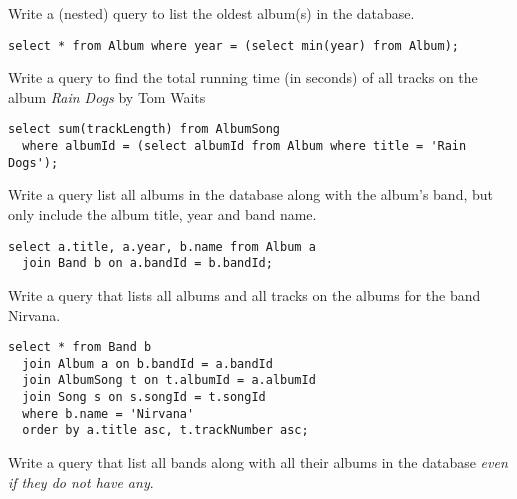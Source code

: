 \documentclass[12pt]{exam}
\begin{document}
\begin{questions}
\question Write a (nested) query to list the oldest album(s) in the database.
\begin{solution}

\begin{verbatim}
select * from Album where year = (select min(year) from Album);
\end{verbatim}
\end{solution}

\question Write a query to find the total running time (in seconds) of all 
tracks on the album \emph{Rain Dogs} by Tom Waits

\begin{solution}

\begin{verbatim}
select sum(trackLength) from AlbumSong 
  where albumId = (select albumId from Album where title = 'Rain Dogs');
\end{verbatim}
\end{solution}


\question Write a query list all albums in the database along with the album's
band, but only include the album title, year and band name.

\begin{solution}

\begin{verbatim}
select a.title, a.year, b.name from Album a 
  join Band b on a.bandId = b.bandId;
\end{verbatim}
\end{solution}

\question Write a query that lists all albums and all tracks on the albums for the
band Nirvana.

\begin{solution}

\begin{verbatim}
select * from Band b
  join Album a on b.bandId = a.bandId
  join AlbumSong t on t.albumId = a.albumId
  join Song s on s.songId = t.songId
  where b.name = 'Nirvana'
  order by a.title asc, t.trackNumber asc;
\end{verbatim}
\end{solution}

\question Write a query that list all bands along with all their albums in the
database \emph{even if they do not have any}.


\end{questions}
\end{document}
